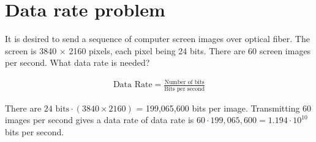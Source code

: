 
\section{Data rate problem}
It is desired to send a sequence of computer screen images over optical fiber. The screen is 3840 $\times$ 2160 pixels, each pixel being 24 bits. There are 60 screen images per second. What data rate is needed?

\begin{align*}
	\text{Data Rate} = \frac{\text{Number of bits}}{\text{Bits per second}}
\end{align*}

There are $24 \text{ bits} \cdot (3840 \times 2160)$ = 199,065,600 bits per image. Transmitting 60 images per second gives a data rate of data rate is $60 \cdot 199,065,600 = 1.194 \cdot 10^{10}$ bits per second.



\section{}
\section{}
\section{}
\section{}
\section{}
\section{}
